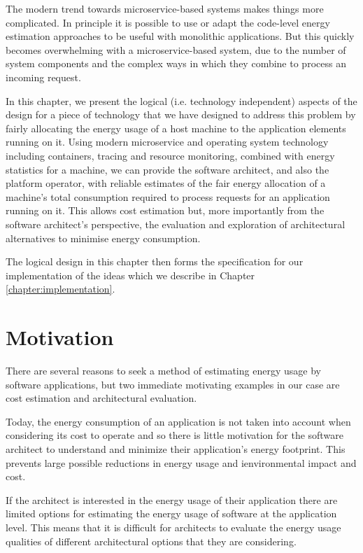 The modern trend towards microservice-based systems \cite{wikipedia_microservices} makes things more complicated.  In principle it is possible to use or adapt the code-level energy estimation approaches to be useful with monolithic applications.  But this quickly becomes overwhelming with a microservice-based system, due to the number of system components and the complex ways in which they combine to process an incoming request.

In this chapter, we present the logical (i.e. technology independent) aspects of the design for a piece of technology that we have designed to address this problem by fairly allocating the energy usage of a host machine to the application elements running on it.  Using modern microservice and operating system technology including containers, tracing and resource monitoring, combined with energy statistics for a machine, we can provide the software architect, and also the platform operator, with reliable estimates of the fair energy allocation of a machine's total consumption required to process requests for an application running on it.  This allows cost estimation but, more importantly from the software architect's perspective, the evaluation and exploration of architectural alternatives to minimise energy consumption.

The logical design in this chapter then forms the specification for our implementation of the ideas which we describe in Chapter \ref{chapter:implementation}.

\section{Motivation}

There are several reasons to seek a method of estimating energy usage by software applications, but two immediate motivating examples in our case are cost estimation and architectural evaluation.

Today, the energy consumption of an application is not taken into account when considering its cost to operate and so there is little motivation for the software architect to understand and minimize their application's energy footprint.  This prevents large possible reductions in energy usage and ienvironmental impact and cost.

If the architect is interested in the energy usage of their application there are limited options for estimating the energy usage of software at the application level.  This means that it is difficult for architects to evaluate the energy usage qualities of different architectural options that they are considering.

